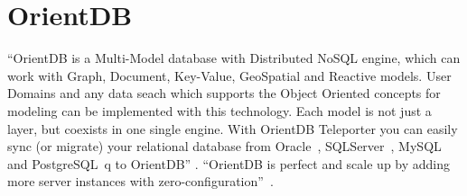 \section{OrientDB}

``OrientDB is a Multi-Model database with Distributed NoSQL engine, which can work with Graph, Document, 
Key-Value, GeoSpatial and Reactive models. User Domains and any data seach which supports the Object 
Oriented concepts for modeling can be implemented with this technology. Each model is not just a layer, 
but coexists in one single engine. With OrientDB Teleporter you can easily sync (or migrate) your 
relational database from Oracle~\cite{??}, SQLServer~\cite{??}, MySQL~\cite{??} and PostgreSQL~\cite{??}q to OrientDB'' \cite{OrientDB}.
``OrientDB is perfect and scale up by adding more server instances with zero-configuration''~\cite{OrientDB-cloud}.
